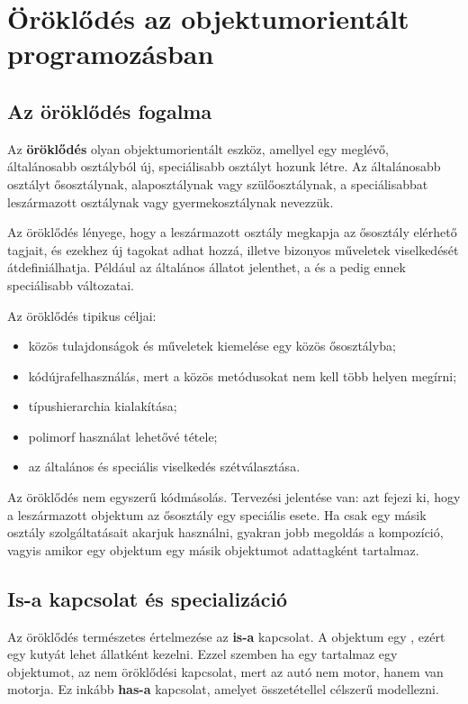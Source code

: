 \section{Öröklődés az objektumorientált programozásban}

\subsection{Az öröklődés fogalma}

Az \textbf{öröklődés} olyan objektumorientált eszköz, amellyel egy meglévő, általánosabb osztályból új, speciálisabb osztályt hozunk létre. Az általánosabb osztályt ősosztálynak, alaposztálynak vagy szülőosztálynak, a speciálisabbat leszármazott osztálynak vagy gyermekosztálynak nevezzük.

Az öröklődés lényege, hogy a leszármazott osztály megkapja az ősosztály elérhető tagjait, és ezekhez új tagokat adhat hozzá, illetve bizonyos műveletek viselkedését átdefiniálhatja. Például az  általános állatot jelenthet, a  és a  pedig ennek speciálisabb változatai.

Az öröklődés tipikus céljai:

\begin{itemize}
  \item közös tulajdonságok és műveletek kiemelése egy közös ősosztályba;
  \item kódújrafelhasználás, mert a közös metódusokat nem kell több helyen megírni;
  \item típushierarchia kialakítása;
  \item polimorf használat lehetővé tétele;
  \item az általános és speciális viselkedés szétválasztása.
\end{itemize}

\begin{warningbox}
Az öröklődés nem egyszerű kódmásolás. Tervezési jelentése van: azt fejezi ki, hogy a leszármazott objektum az ősosztály egy speciális esete. Ha csak egy másik osztály szolgáltatásait akarjuk használni, gyakran jobb megoldás a kompozíció, vagyis amikor egy objektum egy másik objektumot adattagként tartalmaz.
\end{warningbox}

\subsection{Is-a kapcsolat és specializáció}

Az öröklődés természetes értelmezése az \textbf{is-a} kapcsolat. A  objektum egy , ezért egy kutyát lehet állatként kezelni. Ezzel szemben ha egy  tartalmaz egy  objektumot, az nem öröklődési kapcsolat, mert az autó nem motor, hanem van motorja. Ez inkább \textbf{has-a} kapcsolat, amelyet összetétellel célszerű modellezni.

